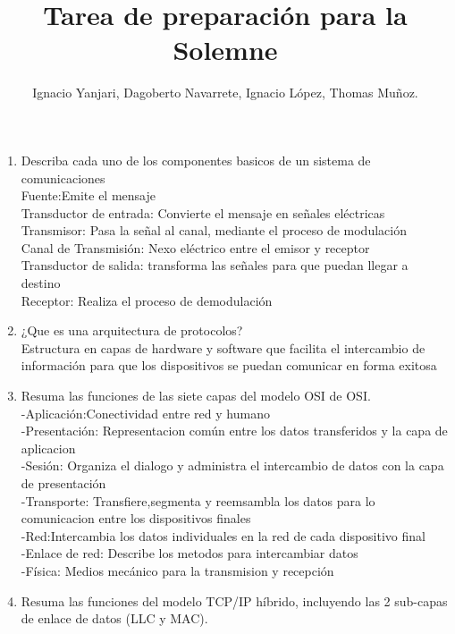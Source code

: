 \documentclass{udparticle}
\title{Tarea de preparación para la Solemne}
\author{Ignacio Yanjari, Dagoberto Navarrete, Ignacio López, Thomas Muñoz.}
\begin{document}
\maketitle
\begin{enumerate}

\item Describa cada uno de los componentes basicos de un sistema de comunicaciones \\
    Fuente:Emite el mensaje\\
    Transductor de entrada: Convierte el mensaje en señales eléctricas\\
    Transmisor: Pasa la señal al canal, mediante el proceso de modulación\\
    Canal de Transmisión: Nexo eléctrico entre el emisor y receptor\\
    Transductor de salida: transforma las señales para que puedan llegar a destino\\
    Receptor: Realiza el proceso de demodulación \\

\item ¿Que es una arquitectura de protocolos? \\
    Estructura en capas de hardware y software que facilita el intercambio de información para que los
    dispositivos se puedan comunicar en forma exitosa\\

\item Resuma las funciones de las siete capas del modelo OSI de OSI.\\
    -Aplicación:Conectividad entre red y humano\\
    -Presentación: Representacion común entre los datos transferidos y la capa de aplicacion\\
    -Sesión: Organiza el dialogo y administra el intercambio de datos con la capa de presentación\\
    -Transporte: Transfiere,segmenta y reemsambla los datos para lo comunicacion entre los dispositivos finales\\
    -Red:Intercambia los datos individuales en la red de cada dispositivo final\\
    -Enlace de red: Describe los metodos para intercambiar datos\\
    -Física: Medios mecánico para la transmision y recepción\\
\item Resuma las funciones del modelo TCP/IP híbrido, incluyendo las 2 sub-capas de enlace de datos
(LLC y MAC).\\


\end{enumerate}
\end{document}
